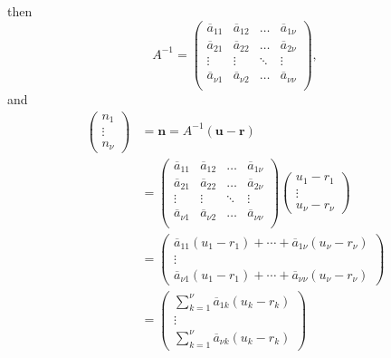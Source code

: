 then 
\[A^{-1} = \begin{pmatrix}
	\overline{a}_{11} & \overline{a}_{12} & \dots & \overline{a}_{1\nu} \\ \overline{a}_{21} & \overline{a}_{22} 	& \dots & \overline{a}_{2\nu}\\
	\vdots & \vdots & \ddots & \vdots\\ \overline{a}_{\nu 1} & \overline{a}_{\nu 2} & \dots 
	& \overline{a}_{\nu\nu}\\ 
	\end{pmatrix},\]
and 
\begin{align*}
\begin{pmatrix} n_1 \\  \vdots \\ n_{\nu} \end{pmatrix}	
	& = \mathbf{n}  = A^{-1}(\mathbf{u} - \mathbf{r})\\
	& = \begin{pmatrix}
	\overline{a}_{11} & \overline{a}_{12} & \dots & \overline{a}_{1\nu} \\ \overline{a}_{21} & \overline{a}_{22} 	& \dots & \overline{a}_{2\nu}\\
	\vdots & \vdots & \ddots & \vdots\\ \overline{a}_{\nu 1} & \overline{a}_{\nu 2} & \dots 
	& \overline{a}_{\nu\nu}\\ 
	\end{pmatrix}
	\begin{pmatrix} u_1-r_1 \\  \vdots \\ u_{\nu}-r_{\nu} \end{pmatrix}\\
	& = \begin{pmatrix} \overline{a}_{11}(u_1-r_1) + \cdots + \overline{a}_{1\nu}(u_{\nu}-r_{\nu}) \\  \vdots \\ \overline{a}_{\nu 1}(u_1-r_1) + \cdots + \overline{a}_{\nu \nu}(u_{\nu}-r_{\nu}) \end{pmatrix}\\
	& = \begin{pmatrix} \sum_{k=1}^{\nu} \overline{a}_{1k}(u_k-r_k)\\  \vdots \\ \sum_{k=1}^{\nu} \overline{a}_{\nu k}(u_k-r_k) \end{pmatrix}
\end{align*}


